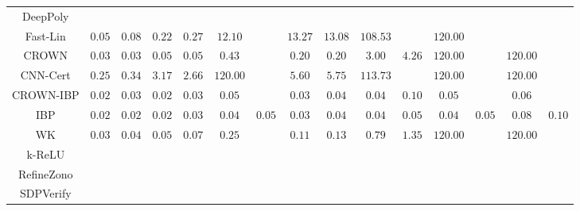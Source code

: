 \begin{table*}
{\begin{tabular}{c|c|c|c|c|c|c|c|c|c|c|c|c|c|c}
     DeepPoly &               &               &               &               &               &               &               &               &               &               &               &               &               &               \\
     Fast-Lin &        $0.05$ &        $0.08$ &        $0.22$ &        $0.27$ &       $12.10$ &               &       $13.27$ &       $13.08$ &      $108.53$ &               &      $120.00$ &               &               &               \\
        CROWN &        $0.03$ &        $0.03$ &        $0.05$ &        $0.05$ &        $0.43$ &               &        $0.20$ &        $0.20$ &        $3.00$ &        $4.26$ &      $120.00$ &               &      $120.00$ &               \\
     CNN-Cert &        $0.25$ &        $0.34$ &        $3.17$ &        $2.66$ &      $120.00$ &               &        $5.60$ &        $5.75$ &      $113.73$ &               &      $120.00$ &               &      $120.00$ &               \\
    CROWN-IBP &        $0.02$ &        $0.03$ &        $0.02$ &        $0.03$ &        $0.05$ &               &        $0.03$ &        $0.04$ &        $0.04$ &        $0.10$ &        $0.05$ &               &        $0.06$ &               \\
          IBP &        $0.02$ &        $0.02$ &        $0.02$ &        $0.03$ &        $0.04$ &        $0.05$ &        $0.03$ &        $0.04$ &        $0.04$ &        $0.05$ &        $0.04$ &        $0.05$ &        $0.08$ &        $0.10$ \\
           WK &        $0.03$ &        $0.04$ &        $0.05$ &        $0.07$ &        $0.25$ &               &        $0.11$ &        $0.13$ &        $0.79$ &        $1.35$ &      $120.00$ &               &      $120.00$ &               \\
       k-ReLU &               &               &               &               &               &               &               &               &               &               &               &               &               &               \\
   RefineZono &               &               &               &               &               &               &               &               &               &               &               &               &               &               \\
    SDPVerify &               &               &               &               &               &               &               &               &               &               &               &               &               &               \\

\end{tabular}}
\end{table*}
